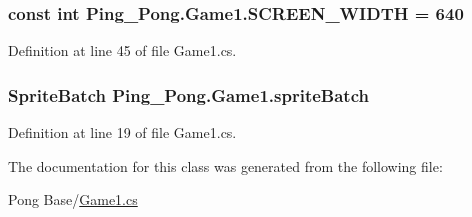 \hypertarget{class_ping___pong_1_1_game1_ae69f627158d80a56475c055372115b55}{
\subsubsection[{S\-C\-R\-E\-E\-N\-\_\-\-W\-I\-D\-T\-H}]{\setlength{\rightskip}{0pt plus 5cm}const int Ping\-\_\-\-Pong.\-Game1.\-S\-C\-R\-E\-E\-N\-\_\-\-W\-I\-D\-T\-H = 640\hspace{0.3cm}{\ttfamily [private]}}}\label{class_ping___pong_1_1_game1_ae69f627158d80a56475c055372115b55}


Definition at line 45 of file Game1.\-cs.

\hypertarget{class_ping___pong_1_1_game1_a887077461615a43e27f62c978affad96}{
\subsubsection[{sprite\-Batch}]{\setlength{\rightskip}{0pt plus 5cm}Sprite\-Batch Ping\-\_\-\-Pong.\-Game1.\-sprite\-Batch\hspace{0.3cm}{\ttfamily [private]}}}\label{class_ping___pong_1_1_game1_a887077461615a43e27f62c978affad96}


Definition at line 19 of file Game1.\-cs.



The documentation for this class was generated from the following file\-:\begin{DoxyCompactItemize}
\item 
Pong Base/\hyperlink{_game1_8cs}{Game1.\-cs}\end{DoxyCompactItemize}
